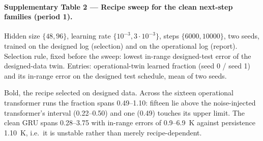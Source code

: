 \documentclass[11pt]{article}
\begin{document}
\paragraph{Supplementary Table 2 --- Recipe sweep for the clean next-step families (period 1).} Hidden size $\{48, 96\}$, learning rate $\{10^{-3}, 3\cdot10^{-3}\}$, steps $\{6000, 10000\}$, two seeds, trained on the designed log (selection) and on the operational log (report). Selection rule, fixed before the sweep: lowest in-range designed-test error of the designed-data twin. Entries: operational-twin learned fraction (seed 0 / seed 1) and its in-range error on the designed test schedule, mean of two seeds.
\begin{center}\small{}\end{center} Bold, the recipe selected on designed data. Across the sixteen operational transformer runs the fraction spans 0.49--1.10: fifteen lie above the noise-injected transformer's interval (0.22--0.50) and one (0.49) touches its upper limit. The clean GRU spans 0.28--3.75 with in-range errors of 0.9--6.9~K against persistence 1.10~K, i.e.\ it is unstable rather than merely recipe-dependent.
\end{document}
